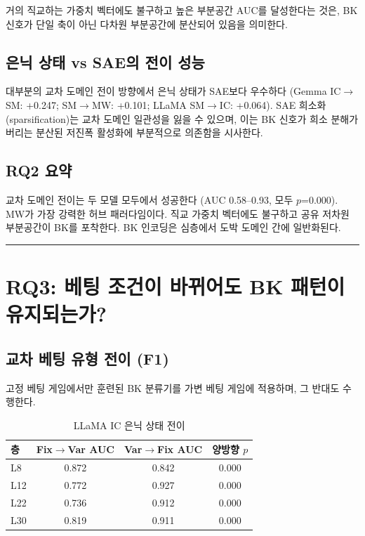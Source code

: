 \documentclass[11pt,a4paper]{article}
\begin{document}
거의 직교하는 가중치 벡터에도 불구하고 높은 부분공간 AUC를 달성한다는 것은, BK 신호가 단일 축이 아닌 다차원 부분공간에 분산되어 있음을 의미한다.

\subsection{은닉 상태 vs SAE의 전이 성능}

대부분의 교차 도메인 전이 방향에서 은닉 상태가 SAE보다 우수하다 (Gemma IC$\rightarrow$SM: +0.247; SM$\rightarrow$MW: +0.101; LLaMA SM$\rightarrow$IC: +0.064). SAE 희소화(sparsification)는 교차 도메인 일관성을 잃을 수 있으며, 이는 BK 신호가 희소 분해가 버리는 분산된 저진폭 활성화에 부분적으로 의존함을 시사한다.

\subsection{RQ2 요약}

교차 도메인 전이는 두 모델 모두에서 성공한다 (AUC 0.58--0.93, 모두 $p$=0.000). MW가 가장 강력한 허브 패러다임이다. 직교 가중치 벡터에도 불구하고 공유 저차원 부분공간이 BK를 포착한다. BK 인코딩은 심층에서 도박 도메인 간에 일반화된다.

\bigskip\hrule\bigskip

\section{RQ3: 베팅 조건이 바뀌어도 BK 패턴이 유지되는가?}

\subsection{교차 베팅 유형 전이 (F1)}

고정 베팅 게임에서만 훈련된 BK 분류기를 가변 베팅 게임에 적용하며, 그 반대도 수행한다.

\begin{table}[H]
\centering
\caption{LLaMA IC 은닉 상태 전이}
\begin{tabular}{lccc}
\toprule
\textbf{층} & \textbf{Fix$\rightarrow$Var AUC} & \textbf{Var$\rightarrow$Fix AUC} & \textbf{양방향 $p$} \\
\midrule
L8 & 0.872 & 0.842 & 0.000 \\
L12 & 0.772 & 0.927 & 0.000 \\
L22 & 0.736 & 0.912 & 0.000 \\
L30 & 0.819 & 0.911 & 0.000 \\
\bottomrule
\end{tabular}
\end{table}
\end{document}
